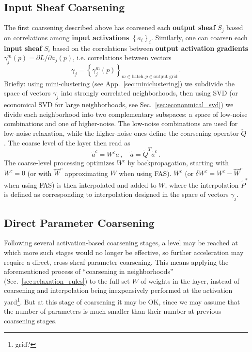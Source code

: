 \documentclass{article} %
\begin{document}
\subsection{Input Sheaf Coarsening}
The first coarsening described above has coarsened each \textbf{output sheaf} $\tilde{S}_j$ based on correlations among \textbf{input activations} $\left\{a_i\right\}_i$. Similarly, one can coarsen each \textbf{input sheaf} $S_i$ based on the correlations between \textbf{output activation gradients}
$\gamma^m_j(p) = \partial L/\partial \tilde{a}_j(p)$, i.e. correlations between vectors
$$
\gamma_j = \left\{ \gamma^m_j(p) \right\}_{m \in \text{batch}, p \in \text{output grid}}\,.
$$
Briefly: using mini-clustering (see App.~\ref{sec:miniclustering}) we subdivide the space of vectors $\gamma_j$ into strongly correlated neighborhoods, then using SVD (or economical SVD for large neighborhoods, see Sec.~\ref{sec:econonmical_svd}) we divide each neighborhood into two complementary subspaces: a space of low-noise combinations and one of higher-noise. The low-noise combinations are used for low-noise relaxation, while the higher-noise ones define the coarsening operator $\tilde{Q}$. The coarse level of the layer then read as
\begin{equation}
    \tilde{a}^c = W^c a\,,\quad \tilde{a} = \tilde{Q}^T \tilde{a}^c\,.
    \label{11.1}
\end{equation}
The coarse-level processing optimizes $W^c$ by backpropagation, starting with $W^c = 0$ (or with $\hat{W}^c$ approximating $W$ when using FAS). $W^c$ (or $\delta W^c = W^c - \hat{W}^c$ when using FAS) is then interpolated and added to $W$, where the interpolation $\tilde{P}^*$ is defined as corresponding to interpolation designed in the space of vectors $\gamma_j$.

\subsection{Direct Parameter Coarsening}
\label{sec:direct_coarsening}
Following several activation-based coarsening stages, a level may be reached at which more such stages would no longer be effective, so further acceleration may require a direct, cross-sheaf parameter coarsening. This means applying the aforementioned process of ``coarsening in neighborhoods'' (Sec.~\ref{sec:relaxation_rules}) to the full set $W$ of weights in the layer, instead of coarsening and interpolation being inexpensively performed at the activation yard\footnote{grid?}. But at this stage of coarsening it may be OK, since we may assume that the number of parameters is much smaller than their number at previous coarsening stages.
\end{document}
